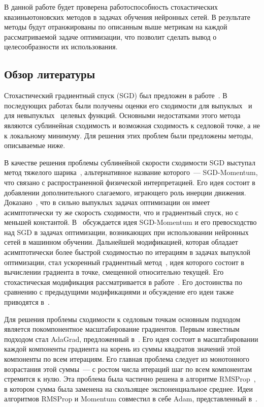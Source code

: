 \documentclass[preprint,12pt]{elsarticle}
\begin{document}
В данной работе будет проверена работоспособность стохастических квазиньютоновских методов в задачах обучения нейронных сетей. В результате методы будут отранжированы по описанным выше метрикам на каждой рассматриваемой задаче оптимизации, что позволит сделать вывод о целесообразности их использования.

\subsection{Обзор литературы}
\label{SS:0.1}
Стохастический градиентный спуск (SGD) был предложен в работе~\cite{SGDorig}.
В последующих работах были получены оценки его сходимости для выпуклых~\cite{SGDconvergence} и для невыпуклых~\cite{SGDconvergenceNonconvex} целевых функций.
Основными недостатками этого метода являются сублинейная сходимость и возможная сходимость к седловой точке, а не к локальному минимуму. Для решения этих проблем были предложены методы, описываемые ниже.

В качестве решения проблемы сублинейной скорости сходимости SGD выступал метод тяжелого шарика~\cite{Polyak}, альтернативное название которого~--- SGD-Momentum, что связано с распространенной физической интерпретацией.
Его идея состоит в добавлении дополнительного слагаемого, играющего роль инерции движения.
Доказано~\cite{HBconvergence}, что в сильно выпуклых задачах оптимизации он имеет асимптотически ту же скорость сходимости, что и градиентный спуск, но с меньшей константой.
В~\cite{GDoverview} обсуждается идея SGD-Momentum и его превосходство над SGD в задачах оптимизации, возникающих при использовании нейронных сетей в машинном обучении. 
Дальнейшей модификацией, которая обладает асимптотически более быстрой сходимостью по итерациям в задачах выпуклой оптимизации, стал ускоренный градиентный метод~\cite{NAG}, идея которого состоит в вычислении градиента в точке, смещенной относительно текущей. 
Его стохастическая модификация рассматривается в работе~\cite{NAGstochastic}.
Его достоинства по сравнению с предыдущими модификациями и обсуждение его идеи также приводятся в~\cite{GDoverview}.

Для решения проблемы сходимости к седловым точкам основным подходом является покомпонентное масштабирование градиентов. 
Первым известным подходом стал AdaGrad, предложенный в~\cite{AdaGrad}. 
Его идея состоит в масштабировании каждой компоненты градиента на корень из суммы квадратов значений этой компоненты по всем итерациям. 
Его главная проблема следует из монотонного возрастания этой суммы~--- с ростом числа итераций шаг по всем компонентам стремится к нулю. 
Эта проблема была частично решена в алгоритме RMSProp~\cite{RMSprop}, в котором сумма была заменена на скользящее экспоненциальное среднее. 
Идеи алгоритмов RMSProp и Momentum совместил в себе Adam, представленный в~\cite{adam}.
\end{document}
